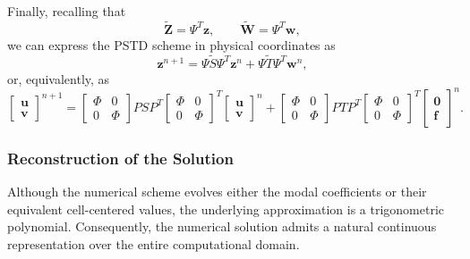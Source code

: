 \documentclass{Configuration_Files/PoliMi3i_thesis}
\begin{document}
Finally, recalling that
\begin{equation*}
    \widetilde{\mathbf Z}
    =
    \Psi^T\mathbf z,
    \qquad
    \widetilde{\mathbf W}
    =
    \Psi^T\mathbf w,
\end{equation*}
we can express the PSTD scheme in physical coordinates as
\begin{equation*}
    \mathbf z^{n+1}
    =
    \Psi
    \widetilde S
    \Psi^T
    \mathbf z^n
    +
    \Psi
    \widetilde T
    \Psi^T
    \mathbf w^n,
\end{equation*}
or, equivalently, as
\begin{equation*}
    \begin{bmatrix}
    \mathbf u\\
    \mathbf v
    \end{bmatrix}^{n+1}
    =
    \begin{bmatrix}
    \Phi&0\\
    0&\Phi
    \end{bmatrix}
    P S P^T
    \begin{bmatrix}
    \Phi&0\\
    0&\Phi
    \end{bmatrix}^T
    \begin{bmatrix}
    \mathbf u\\
    \mathbf v
    \end{bmatrix}^n
    +
    \begin{bmatrix}
    \Phi&0\\
    0&\Phi
    \end{bmatrix}
    P T P^T
    \begin{bmatrix}
    \Phi&0\\
    0&\Phi
    \end{bmatrix}^T
    \begin{bmatrix}
    \mathbf 0\\
    \mathbf f
    \end{bmatrix}^n.
\end{equation*}

\subsubsection{Reconstruction of the Solution}

Although the numerical scheme evolves either the modal coefficients or their
equivalent cell-centered values, the underlying approximation is a trigonometric
polynomial. Consequently, the numerical solution admits a natural continuous
representation over the entire computational domain.
\end{document}
